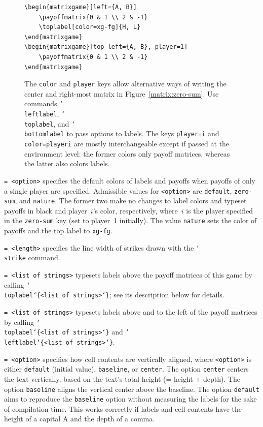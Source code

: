 \documentclass{article}
\newenvironment{desc}{\itemize[leftmargin=50pt]}{\enditemize}
\def\option#1#2{\item[\texttt{#1}] \hskip-1.5pt\texttt{#2}}
\renewcommand{\textbackslash}{\char`\\}
\def\cmd#1{\texttt{\color{cmd}\textbackslash#1}}
\def\leftbrace{\char`\{}
\def\rightbrace{\char`\}}
\def\arg#1{{\color{cmd}\leftbrace}{\color{black}#1}{\color{cmd}\rightbrace}}
\begin{document}
\begin{desc}
\begin{figure}
\begin{verbatim}
\begin{matrixgame}[left={A, B}]
	\payoffmatrix{0 & 1 \\ 2 & -1}
	\toplabel[color=xg-fg]{H, L}
\end{matrixgame}
\begin{matrixgame}[top left={A, B}, player=1]
	\payoffmatrix{0 & 1 \\ 2 & -1}
\end{matrixgame}
\end{verbatim}
\caption{The \texttt{color} and \texttt{player} keys allow alternative ways of writing the center and right-most matrix in Figure~\ref{matrix:zero-sum}. Use commands \cmd{leftlabel}, \cmd{toplabel}, and \cmd{bottomlabel} to pass options to labels. The keys \texttt{player=i} and \texttt{color=playeri} are mostly interchangeable except if passed at the environment level: the former colors only payoff matrices, whereas the latter also colors labels.}\label{matrix:color}
\end{figure}

\option{single player}{= <option>} specifies the default colors of labels and payoffs when payoffs of only a single player are specified. Admissible values for \texttt{<option>} are \texttt{default}, \texttt{zero-sum}, and \texttt{nature}. The former two make no changes to label colors and typeset payoffs in black and player~$i$'s color, respectively, where~$i$ is the player specified in the \texttt{zero-sum} key (set to player~1 initially). The value \texttt{nature} sets the color of payoffs and the top label to \texttt{xg-fg}.

\option{strike width}{= <length>} specifies the line width of strikes drawn with the \cmd{strike} command.

\option{top}{= <list of strings>} typesets labels above the payoff matrices of this game by calling \cmd{toplabel\arg{<list of strings>}}; see its description below for details.

\option{top left}{= <list of strings>} typesets labels above and to the left of the payoff matrices by calling \cmd{toplabel\arg{<list of strings>}} and \cmd{leftlabel\arg{<list of strings>}}.

\option{vertical align}{= <option>} specifies how cell contents are vertically aligned, where \texttt{<option>} is either \texttt{default} (initial value), \texttt{baseline}, or \texttt{center}. The option \texttt{center} centers the text vertically, based on the text's total height (= height + depth). The option \texttt{baseline} aligns the vertical center above the baseline. The option \texttt{default} aims to reproduce the \texttt{baseline} option without measuring the labels for the sake of compilation time. This works correctly if labels and cell contents have the height of a capital A and the depth of a comma.


\end{desc}
\end{document}
